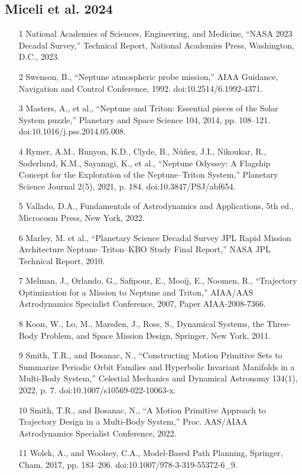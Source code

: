 \documentclass[12pt]{article}
\begin{document}
\subsection*{Miceli et al. 2024}
\begin{enumerate}
\item [1] National Academies of Sciences, Engineering, and Medicine, ``NASA 2023 Decadal Survey,'' Technical Report, National Academies Press, Washington, D.C., 2023.
\item [2] Swenson, B., ``Neptune atmospheric probe mission,'' AIAA Guidance, Navigation and Control Conference, 1992. doi:10.2514/6.1992-4371.
\item [3] Masters, A., et al., ``Neptune and Triton: Essential pieces of the Solar System puzzle,'' Planetary and Space Science 104, 2014, pp. 108--121. doi:10.1016/j.pss.2014.05.008.
\item [4] Rymer, A.M., Runyon, K.D., Clyde, B., Núñez, J.I., Nikoukar, R., Soderlund, K.M., Sayanagi, K., et al., ``Neptune Odyssey: A Flagship Concept for the Exploration of the Neptune--Triton System,'' Planetary Science Journal 2(5), 2021, p. 184. doi:10.3847/PSJ/abf654.
\item [5] Vallado, D.A., Fundamentals of Astrodynamics and Applications, 5th ed., Microcosm Press, New York, 2022.
\item [6] Marley, M. et al., ``Planetary Science Decadal Survey JPL Rapid Mission Architecture Neptune--Triton--KBO Study Final Report,'' NASA JPL Technical Report, 2010.
\item [7] Melman, J., Orlando, G., Safipour, E., Mooij, E., Noomen, R., ``Trajectory Optimization for a Mission to Neptune and Triton,'' AIAA/AAS Astrodynamics Specialist Conference, 2007, Paper AIAA-2008-7366.
\item [8] Koon, W., Lo, M., Marsden, J., Ross, S., Dynamical Systems, the Three-Body Problem, and Space Mission Design, Springer, New York, 2011.
\item [9] Smith, T.R., and Bosanac, N., ``Constructing Motion Primitive Sets to Summarize Periodic Orbit Families and Hyperbolic Invariant Manifolds in a Multi-Body System,'' Celestial Mechanics and Dynamical Astronomy 134(1), 2022, p. 7. doi:10.1007/s10569-022-10063-x.
\item [10] Smith, T.R., and Bosanac, N., ``A Motion Primitive Approach to Trajectory Design in a Multi-Body System,'' Proc. AAS/AIAA Astrodynamics Specialist Conference, 2022.
\item [11] Wolek, A., and Woolsey, C.A., Model-Based Path Planning, Springer, Cham, 2017, pp. 183--206. doi:10.1007/978-3-319-55372-6_9.

\end{enumerate}
\end{document}
